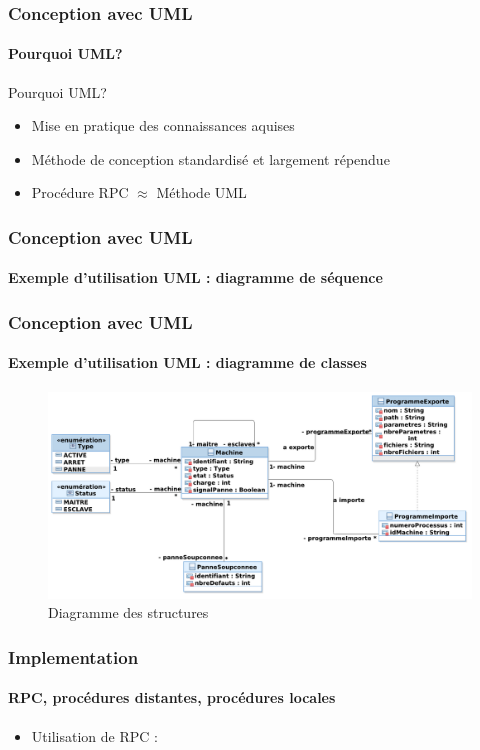 \documentclass{beamer}
\begin{document}
  \begin{frame}
    \frametitle{Conception avec UML}
    \framesubtitle{Pourquoi UML?}
    \begin{block}{Pourquoi UML?}
      \begin{itemize}
        \item Mise en pratique des connaissances aquises
        \item Méthode de conception standardisé et largement répendue
        \item Procédure RPC $\approx$ Méthode UML
      \end{itemize}
    \end{block}
  \end{frame}
  
  \begin{frame}
    \frametitle{Conception avec UML}
    \framesubtitle{Exemple d'utilisation UML : diagramme de séquence}
  \end{frame}
  
  \begin{frame}
    \frametitle{Conception avec UML}
    \framesubtitle{Exemple d'utilisation UML : diagramme de classes}
      \begin{figure}[h!]
        \centering
        \includegraphics[scale=0.43]{img/analyse_dcl.pdf}
        \caption{Diagramme des structures}
      \end{figure}
  \end{frame}
  
  \begin{frame}
    \frametitle{Implementation}
    \framesubtitle{RPC, procédures distantes, procédures locales}
      \begin{itemize}
        \item Utilisation de RPC :
      \end{itemize}
  \end{frame}
  
\end{document}
